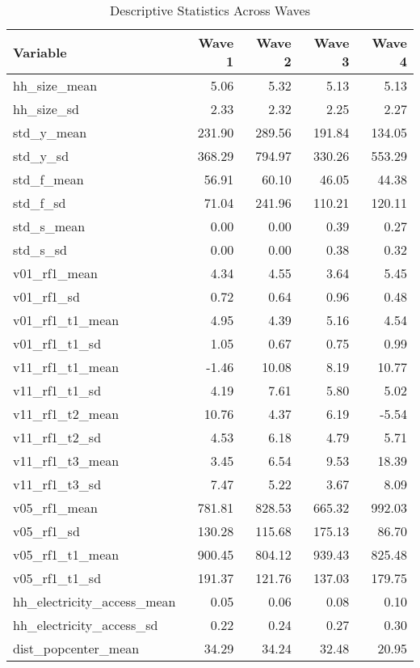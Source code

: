 \begin{table}[ht]
\centering
\caption{Descriptive Statistics Across Waves} 
\begin{tabular}{lrrrr}
  \hline
Variable & Wave 1 & Wave 2 & Wave 3 & Wave 4 \\ 
  \hline
hh_size_mean & 5.06 & 5.32 & 5.13 & 5.13 \\ 
  hh_size_sd & 2.33 & 2.32 & 2.25 & 2.27 \\ 
  std_y_mean & 231.90 & 289.56 & 191.84 & 134.05 \\ 
  std_y_sd & 368.29 & 794.97 & 330.26 & 553.29 \\ 
  std_f_mean & 56.91 & 60.10 & 46.05 & 44.38 \\ 
  std_f_sd & 71.04 & 241.96 & 110.21 & 120.11 \\ 
  std_s_mean & 0.00 & 0.00 & 0.39 & 0.27 \\ 
  std_s_sd & 0.00 & 0.00 & 0.38 & 0.32 \\ 
  v01_rf1_mean & 4.34 & 4.55 & 3.64 & 5.45 \\ 
  v01_rf1_sd & 0.72 & 0.64 & 0.96 & 0.48 \\ 
  v01_rf1_t1_mean & 4.95 & 4.39 & 5.16 & 4.54 \\ 
  v01_rf1_t1_sd & 1.05 & 0.67 & 0.75 & 0.99 \\ 
  v11_rf1_t1_mean & -1.46 & 10.08 & 8.19 & 10.77 \\ 
  v11_rf1_t1_sd & 4.19 & 7.61 & 5.80 & 5.02 \\ 
  v11_rf1_t2_mean & 10.76 & 4.37 & 6.19 & -5.54 \\ 
  v11_rf1_t2_sd & 4.53 & 6.18 & 4.79 & 5.71 \\ 
  v11_rf1_t3_mean & 3.45 & 6.54 & 9.53 & 18.39 \\ 
  v11_rf1_t3_sd & 7.47 & 5.22 & 3.67 & 8.09 \\ 
  v05_rf1_mean & 781.81 & 828.53 & 665.32 & 992.03 \\ 
  v05_rf1_sd & 130.28 & 115.68 & 175.13 & 86.70 \\ 
  v05_rf1_t1_mean & 900.45 & 804.12 & 939.43 & 825.48 \\ 
  v05_rf1_t1_sd & 191.37 & 121.76 & 137.03 & 179.75 \\ 
  hh_electricity_access_mean & 0.05 & 0.06 & 0.08 & 0.10 \\ 
  hh_electricity_access_sd & 0.22 & 0.24 & 0.27 & 0.30 \\ 
  dist_popcenter_mean & 34.29 & 34.24 & 32.48 & 20.95 \\ 

\end{tabular}
\end{table}
